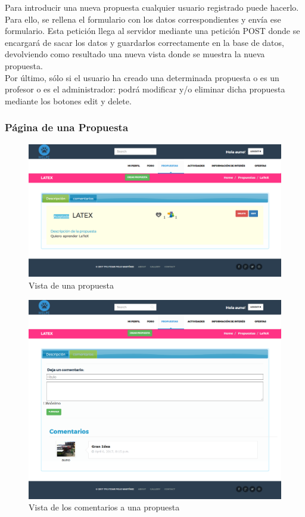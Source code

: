 Para introducir una nueva propuesta cualquier usuario registrado puede hacerlo. Para ello, se rellena el formulario con los datos correspondientes y envía ese formulario. Esta petición llega al servidor mediante una petición POST donde se encargará de sacar los datos y guardarlos correctamente en la base de datos, devolviendo como resultado una nueva vista donde se muestra la nueva propuesta.\\
Por último, sólo si el usuario ha creado una determinada propuesta o es un profesor o es el administrador: podrá modificar y/o eliminar dicha propuesta mediante los botones edit y delete.

\subsubsection{Página de una Propuesta}
\label{subsubsec:propuesta}
\begin{figure}[H]
\centering
\includegraphics[width=12cm]{img/propuesta}
\caption{Vista de una propuesta}
\label{figura:propuesta}
\end{figure}
\begin{figure}[H]
\centering
\includegraphics[width=12cm]{img/propuesta_comment}
\caption{Vista de los comentarios a una propuesta}
\label{figura:propuesta_comment}
\end{figure}
